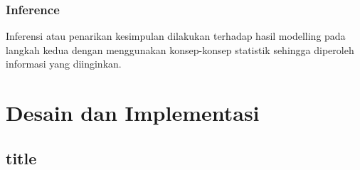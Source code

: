 \documentclass{article}
\begin{document}
\subsubsection{Inference}

\begin{adjustwidth}{4em}{0pt}
	
\hspace{\parindent}Inferensi atau penarikan kesimpulan dilakukan terhadap hasil modelling pada langkah kedua dengan menggunakan konsep-konsep statistik sehingga diperoleh informasi yang diinginkan.

\end{adjustwidth}

\section{Desain dan Implementasi}

\subsection{title}
\end{document}
